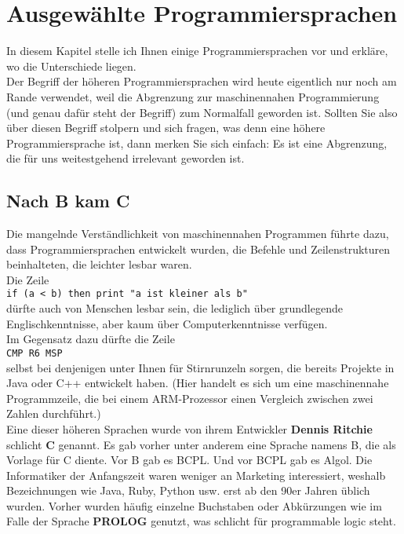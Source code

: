 \chapter{Ausgewählte Programmiersprachen}
In diesem Kapitel stelle ich Ihnen einige Programmiersprachen vor und erkläre, wo die Unterschiede liegen.\\

Der Begriff der höheren Programmiersprachen wird heute eigentlich nur noch am Rande verwendet, weil die Abgrenzung zur maschinennahen Programmierung (und genau dafür steht der Begriff) zum Normalfall geworden ist. Sollten Sie also über diesen Begriff stolpern und sich fragen, was denn eine höhere Programmiersprache ist, dann merken Sie sich einfach: Es ist eine Abgrenzung, die für uns weitestgehend irrelevant geworden ist.

\section{Nach B kam C}
Die mangelnde Verständlichkeit von maschinennahen Programmen führte dazu, dass Programmiersprachen entwickelt wurden, die Befehle und Zeilenstrukturen beinhalteten, die leichter lesbar waren.\\

Die Zeile \\

\verb~if (a < b) then print "a ist kleiner als b"~\\

dürfte auch von Menschen lesbar sein, die lediglich über grundlegende Englischkenntnisse, aber kaum über Computerkenntnisse verfügen.\\

Im Gegensatz dazu dürfte die Zeile\\

\verb~CMP R6 MSP~\\

selbst bei denjenigen unter Ihnen für Stirnrunzeln sorgen, die bereits Projekte in Java oder C++ entwickelt haben. (Hier handelt es sich um eine maschinennahe Programmzeile, die bei einem ARM-Prozessor einen Vergleich zwischen zwei Zahlen durchführt.)\\

Eine dieser höheren Sprachen wurde von ihrem Entwickler \textbf{Dennis Ritchie} schlicht \textbf{C} genannt. Es gab vorher unter anderem eine Sprache namens B, die als Vorlage für C diente. Vor B gab es BCPL. Und vor BCPL gab es Algol. Die Informatiker der Anfangszeit waren weniger an Marketing interessiert, weshalb Bezeichnungen wie Java, Ruby, Python usw. erst ab den 90er Jahren üblich wurden. Vorher wurden häufig einzelne Buchstaben oder Abkürzungen wie im Falle der Sprache \textbf{PROLOG} genutzt, was schlicht für programmable logic steht.\\

